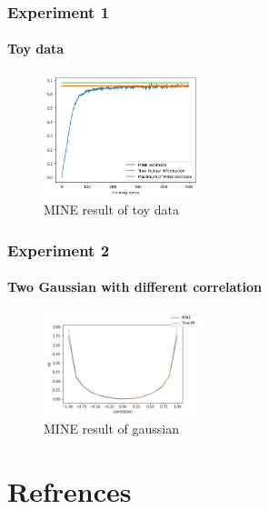 \documentclass[aspectratio=169]{beamer}
\begin{document}
\begin{frame}
	\frametitle{Experiment 1}
	\framesubtitle{Toy data}
	\begin{figure}
		\centering
		\includegraphics[width=0.4\textwidth]{./images/toy_data_mine.png}
		\caption{MINE result of toy data}
		\label{fig:mine_result_toy}
	\end{figure}
\end{frame}

\begin{frame}
	\frametitle{Experiment 2}
	\framesubtitle{Two Gaussian with different correlation}
	\begin{figure}
		\centering
		\includegraphics[width=0.4\textwidth]{./images/gaussian.png}
		\caption{MINE result of gaussian}
		\label{fig:mine_result_gaussian}
	\end{figure}
\end{frame}




\section{Refrences}
\begin{frame}
\end{frame}
\end{document}

